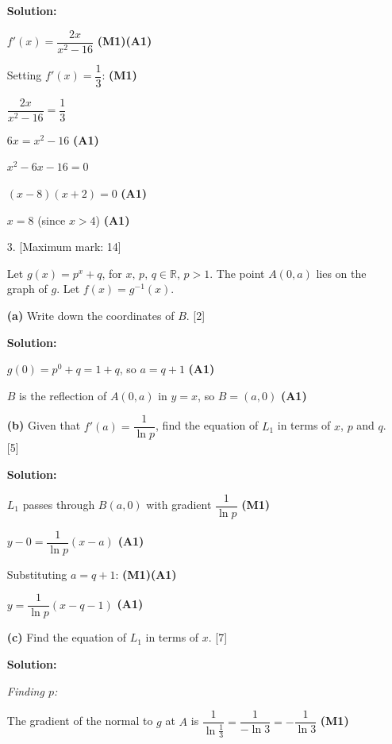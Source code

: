\documentclass[12pt, twoside]{article}
\begin{document}
\begin{enumerate}[itemsep=0.3cm]
\textbf{Solution:}

$f'(x) = \dfrac{2x}{x^2 - 16}$ \hfill \textbf{(M1)(A1)}

Setting $f'(x) = \dfrac{1}{3}$: \hfill \textbf{(M1)}

$\dfrac{2x}{x^2 - 16} = \dfrac{1}{3}$

$6x = x^2 - 16$ \hfill \textbf{(A1)}

$x^2 - 6x - 16 = 0$

$(x - 8)(x + 2) = 0$ \hfill \textbf{(A1)}

$x = 8$ \quad (since $x > 4$) \hfill \textbf{(A1)}

\newpage

\item[3.] [Maximum mark: 14]

Let $g(x) = p^x + q$, for $x, \, p, \, q \in \mathbb{R}$, $p > 1$.
The point $A(0, a)$ lies on the graph of $g$.
Let $f(x) = g^{-1}(x)$.

\medskip

\textbf{(a)} Write down the coordinates of $B$. \hfill [2]

\textbf{Solution:}

$g(0) = p^0 + q = 1 + q$, so $a = q + 1$ \hfill \textbf{(A1)}

$B$ is the reflection of $A(0, a)$ in $y = x$,
so $B = (a, 0)$ \hfill \textbf{(A1)}

\medskip

\textbf{(b)} Given that $f'(a) = \dfrac{1}{\ln p}$, find the
equation of $L_1$ in terms of $x$, $p$ and $q$. \hfill [5]

\textbf{Solution:}

$L_1$ passes through $B(a, 0)$ with gradient
$\dfrac{1}{\ln p}$ \hfill \textbf{(M1)}

$y - 0 = \dfrac{1}{\ln p}(x - a)$ \hfill \textbf{(A1)}

Substituting $a = q + 1$: \hfill \textbf{(M1)(A1)}

$y = \dfrac{1}{\ln p}(x - q - 1)$ \hfill \textbf{(A1)}

\medskip

\textbf{(c)} Find the equation of $L_1$ in terms of $x$. \hfill [7]

\textbf{Solution:}

\emph{Finding $p$:}

The gradient of the normal to $g$ at $A$ is
$\dfrac{1}{\ln \frac{1}{3}} = \dfrac{1}{-\ln 3}
= -\dfrac{1}{\ln 3}$ \hfill \textbf{(M1)}


\end{enumerate}
\end{document}
